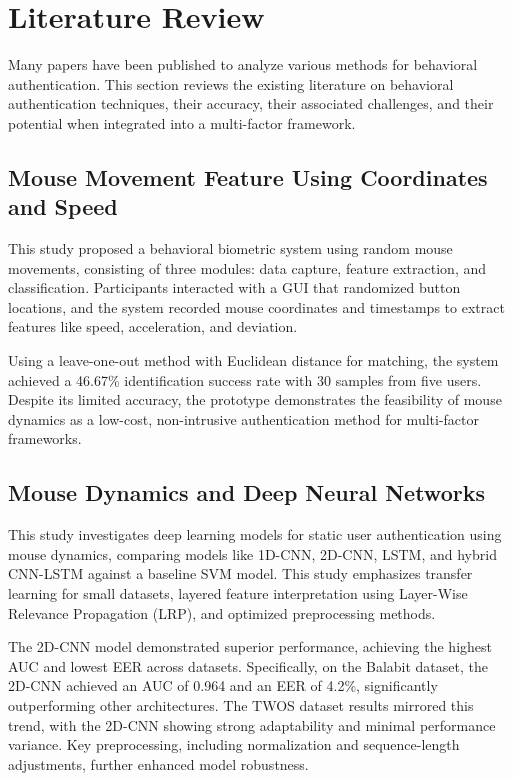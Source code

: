 \section{Literature Review}
\label{sec:literature-review}

Many papers have been published to analyze various methods for behavioral authentication. This section reviews the existing literature on behavioral authentication techniques, their accuracy, their associated challenges, and their potential when integrated into a multi-factor framework.

\subsection{Mouse Movement Feature Using Coordinates and Speed}
\label{subsec:mouse-movement-feature-using-coordinates-and-speed}

\parencite{21_Mouse_Coordinate_Speed} This study proposed a behavioral biometric system using random mouse movements, consisting of three modules: data capture, feature extraction, and classification. Participants interacted with a GUI that randomized button locations, and the system recorded mouse coordinates and timestamps to extract features like speed, acceleration, and deviation.

Using a leave-one-out method with Euclidean distance for matching, the system achieved a 46.67\% identification success rate with 30 samples from five users. Despite its limited accuracy, the prototype demonstrates the feasibility of mouse dynamics as a low-cost, non-intrusive authentication method for multi-factor frameworks.

\subsection{Mouse Dynamics and Deep Neural Networks}

\parencite{20_Mouse_Coordinate} This study investigates deep learning models for static user authentication using mouse dynamics, comparing models like 1D-CNN, 2D-CNN, LSTM, and hybrid CNN-LSTM against a baseline SVM model. This study emphasizes transfer learning for small datasets, layered feature interpretation using Layer-Wise Relevance Propagation (LRP), and optimized preprocessing methods.

The 2D-CNN model demonstrated superior performance, achieving the highest AUC and lowest EER across datasets. Specifically, on the Balabit dataset, the 2D-CNN achieved an AUC of 0.964 and an EER of 4.2\%, significantly outperforming other architectures. The TWOS dataset results mirrored this trend, with the 2D-CNN showing strong adaptability and minimal performance variance. Key preprocessing, including normalization and sequence-length adjustments, further enhanced model robustness.

